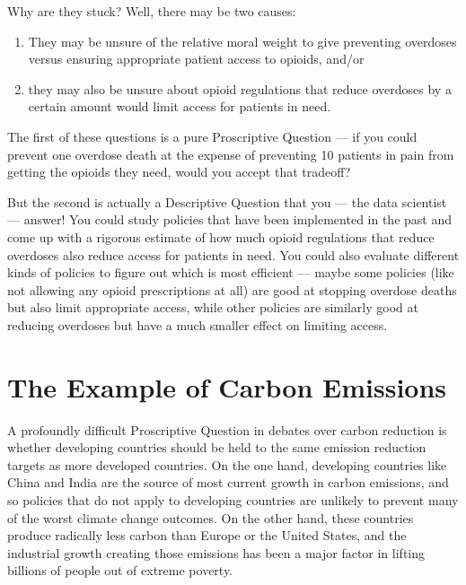 \documentclass[letterpaper,10pt,english]{jupyterBook}
\begin{document}
\sphinxAtStartPar
Why are they stuck? Well, there may be two causes:
\begin{enumerate}
%
\item {} 
\sphinxAtStartPar
They may be unsure of the relative moral weight to give preventing overdoses versus ensuring appropriate patient access to opioids, and/or

\item {} 
\sphinxAtStartPar
they may also be unsure about  opioid regulations that reduce overdoses by a certain amount would limit access for patients in need.

\end{enumerate}

\sphinxAtStartPar
The first of these questions is a pure Proscriptive Question — if you could prevent one overdose death at the expense of preventing 10 patients in pain from getting the opioids they need, would you accept that trade\sphinxhyphen{}off?

\sphinxAtStartPar
But the second is actually a Descriptive Question that you — the data scientist —  answer! You could study policies that have been implemented in the past and come up with a rigorous estimate of how much opioid regulations that reduce overdoses also reduce access for patients in need. You could also evaluate different kinds of policies to figure out which is most efficient — maybe some policies (like not allowing any opioid prescriptions at all) are good at stopping overdose deaths but also  limit appropriate access, while other policies are similarly good at reducing overdoses but have a much smaller effect on limiting access.


\section{The Example of Carbon Emissions}
\label{\detokenize{30_questions/05_descriptive_v_proscriptive:the-example-of-carbon-emissions}}
\sphinxAtStartPar
A profoundly difficult Proscriptive Question in debates over carbon reduction is whether developing countries should be held to the same emission reduction targets as more developed countries. On the one hand, developing countries like China and India are the source of most current growth in carbon emissions, and so policies that do not apply to developing countries are unlikely to prevent many of the worst climate change outcomes. On the other hand, these countries produce radically less carbon  than Europe or the United States, and the industrial growth creating those emissions has been a major factor in lifting billions of people out of extreme poverty.
\end{document}
